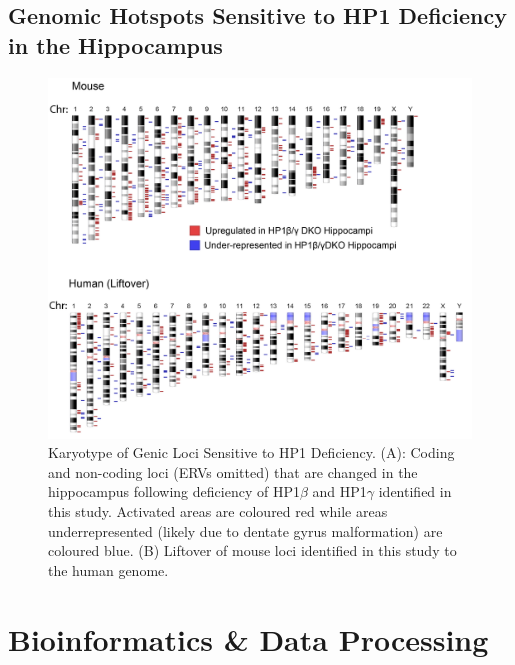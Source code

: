 \documentclass[onehalf,12pt]{beavtex}
\begin{document}
  \section{Genomic Hotspots Sensitive to HP1 Deficiency in the
  Hippocampus}\label{genomic-hotspots-sensitive-to-hp1-deficiency-in-the-hippocampus}
  
  \begin{figure}
  
  {\centering \includegraphics[width=1\linewidth, ]{./figure/discussion/hotspots} 
  
  }
  
  \caption[Karyotype of Genic Loci Sensitive to HP1 Deficiency in The Hippocampus]{Karyotype of Genic Loci Sensitive to HP1 Deficiency. (A): Coding and non-coding loci (ERVs omitted) that are changed in the hippocampus following deficiency of HP1$\beta$ and HP1$\gamma$ identified in this study. Activated areas are coloured red while areas underrepresented (likely due to dentate gyrus malformation) are coloured blue. (B) Liftover of mouse loci identified in this study to the human genome.}\label{fig:hotspots}
  \end{figure}
  
  \newpage
  
  \chapter{Bioinformatics \& Data
  Processing}\label{bioinformatics-data-processing}
  
\end{document}

